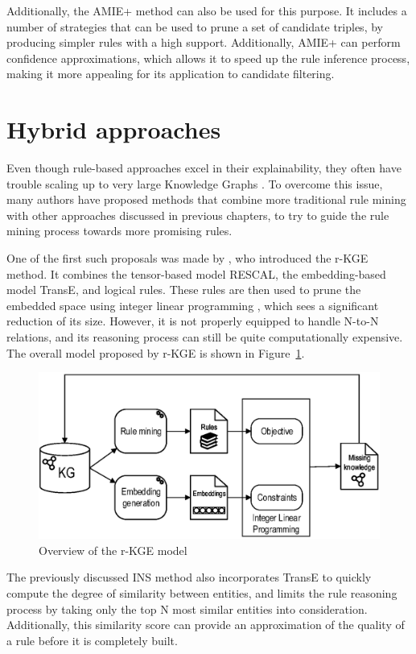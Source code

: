 Additionally, the AMIE+ method \cite{galarraga2015} can also be used for this purpose. It includes a number of strategies that can be used to prune a set of candidate triples, by producing simpler rules with a high support. Additionally, AMIE+ can perform confidence approximations, which allows it to speed up the rule inference process, making it more appealing for its application to candidate filtering.


\section{Hybrid approaches}\label{sec:rule-hybrid}
Even though rule-based approaches excel in their explainability, they often have trouble scaling up to very large Knowledge Graphs \cite{shen2022overview}. To overcome this issue, many authors have proposed methods that combine more traditional rule mining with other approaches discussed in previous chapters, to try to guide the rule mining process towards more promising rules.

One of the first such proposals was made by \citet{wang2015b}, who introduced the r-KGE method. It combines the tensor-based model RESCAL, the embedding-based model TransE, and logical rules. These rules are then used to prune the embedded space using integer linear programming \cite{schrijver1999}, which sees a significant reduction of its size. However, it is not properly equipped to handle N-to-N relations, and its reasoning process can still be quite computationally expensive. The overall model proposed by r-KGE is shown in Figure~\ref{fig:rule-rkge}.

\begin{figure}[!htp]
    \centering
    \includegraphics[width=.9\textwidth]{fig/rules/rkge}
    \caption{Overview of the r-KGE model}
    \label{fig:rule-rkge}
\end{figure}

The previously discussed INS method \cite{wei2015} also incorporates TransE to quickly compute the degree of similarity between entities, and limits the rule reasoning process by taking only the top N most similar entities into consideration. Additionally, this similarity score can provide an approximation of the quality of a rule before it is completely built.

